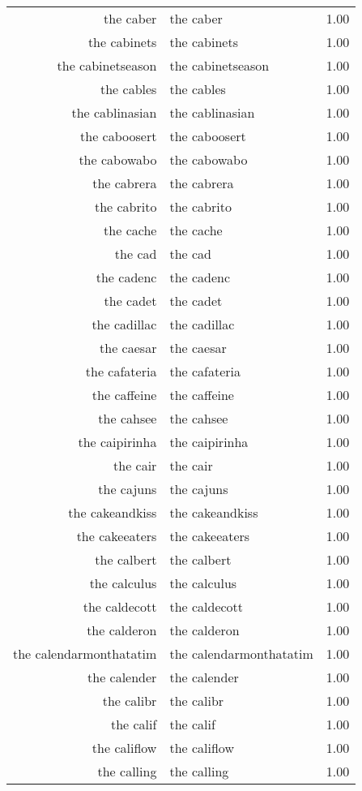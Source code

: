\begin{table}[ht]
\begin{tabular}{rlr}
  the caber & the caber & 1.00 \\ 
  the cabinets & the cabinets & 1.00 \\ 
  the cabinetseason & the cabinetseason & 1.00 \\ 
  the cables & the cables & 1.00 \\ 
  the cablinasian & the cablinasian & 1.00 \\ 
  the caboosert & the caboosert & 1.00 \\ 
  the cabowabo & the cabowabo & 1.00 \\ 
  the cabrera & the cabrera & 1.00 \\ 
  the cabrito & the cabrito & 1.00 \\ 
  the cache & the cache & 1.00 \\ 
  the cad & the cad & 1.00 \\ 
  the cadenc & the cadenc & 1.00 \\ 
  the cadet & the cadet & 1.00 \\ 
  the cadillac & the cadillac & 1.00 \\ 
  the caesar & the caesar & 1.00 \\ 
  the cafateria & the cafateria & 1.00 \\ 
  the caffeine & the caffeine & 1.00 \\ 
  the cahsee & the cahsee & 1.00 \\ 
  the caipirinha & the caipirinha & 1.00 \\ 
  the cair & the cair & 1.00 \\ 
  the cajuns & the cajuns & 1.00 \\ 
  the cakeandkiss & the cakeandkiss & 1.00 \\ 
  the cakeeaters & the cakeeaters & 1.00 \\ 
  the calbert & the calbert & 1.00 \\ 
  the calculus & the calculus & 1.00 \\ 
  the caldecott & the caldecott & 1.00 \\ 
  the calderon & the calderon & 1.00 \\ 
  the calendarmonthatatim & the calendarmonthatatim & 1.00 \\ 
  the calender & the calender & 1.00 \\ 
  the calibr & the calibr & 1.00 \\ 
  the calif & the calif & 1.00 \\ 
  the califlow & the califlow & 1.00 \\ 
  the calling & the calling & 1.00 \\ 

\end{tabular}
\end{table}
